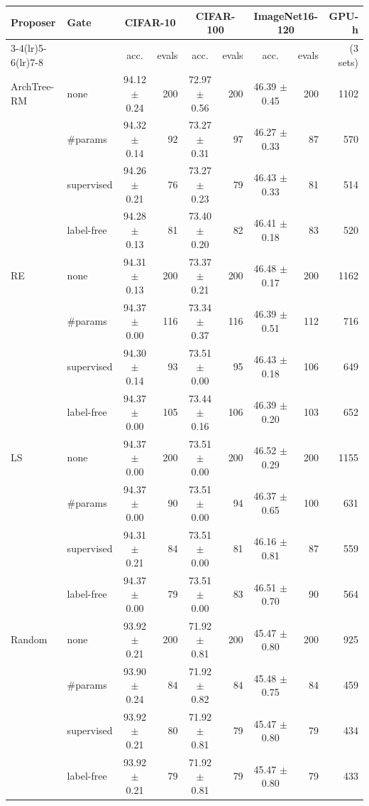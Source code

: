 \begin{tabular}{@{}llcrcrcrr@{}}
\toprule
\multirow{2}{*}{Proposer} & \multirow{2}{*}{Gate} & \multicolumn{2}{c}{CIFAR-10} & \multicolumn{2}{c}{CIFAR-100} & \multicolumn{2}{c}{ImageNet16-120} & GPU-h\\
\cmidrule(lr){3-4}\cmidrule(lr){5-6}\cmidrule(lr){7-8}
 & & acc. & evals & acc. & evals & acc. & evals & (3 sets)\\
\midrule
ArchTree-RM & none & 94.12 $\pm$ 0.24 & 200 & 72.97 $\pm$ 0.56 & 200 & 46.39 $\pm$ 0.45 & 200 & 1102\\
 & \#params & 94.32 $\pm$ 0.14 & 92 & 73.27 $\pm$ 0.31 & 97 & 46.27 $\pm$ 0.33 & 87 & 570\\
 & supervised & 94.26 $\pm$ 0.21 & 76 & 73.27 $\pm$ 0.23 & 79 & 46.43 $\pm$ 0.33 & 81 & 514\\
 & label-free & 94.28 $\pm$ 0.13 & 81 & 73.40 $\pm$ 0.20 & 82 & 46.41 $\pm$ 0.18 & 83 & 520\\
\midrule
RE & none & 94.31 $\pm$ 0.13 & 200 & 73.37 $\pm$ 0.21 & 200 & 46.48 $\pm$ 0.17 & 200 & 1162\\
 & \#params & 94.37 $\pm$ 0.00 & 116 & 73.34 $\pm$ 0.37 & 116 & 46.39 $\pm$ 0.51 & 112 & 716\\
 & supervised & 94.30 $\pm$ 0.14 & 93 & 73.51 $\pm$ 0.00 & 95 & 46.43 $\pm$ 0.18 & 106 & 649\\
 & label-free & 94.37 $\pm$ 0.00 & 105 & 73.44 $\pm$ 0.16 & 106 & 46.39 $\pm$ 0.20 & 103 & 652\\
\midrule
LS & none & 94.37 $\pm$ 0.00 & 200 & 73.51 $\pm$ 0.00 & 200 & 46.52 $\pm$ 0.29 & 200 & 1155\\
 & \#params & 94.37 $\pm$ 0.00 & 90 & 73.51 $\pm$ 0.00 & 94 & 46.37 $\pm$ 0.65 & 100 & 631\\
 & supervised & 94.31 $\pm$ 0.21 & 84 & 73.51 $\pm$ 0.00 & 81 & 46.16 $\pm$ 0.81 & 87 & 559\\
 & label-free & 94.37 $\pm$ 0.00 & 79 & 73.51 $\pm$ 0.00 & 83 & 46.51 $\pm$ 0.70 & 90 & 564\\
\midrule
Random & none & 93.92 $\pm$ 0.21 & 200 & 71.92 $\pm$ 0.81 & 200 & 45.47 $\pm$ 0.80 & 200 & 925\\
 & \#params & 93.90 $\pm$ 0.24 & 84 & 71.92 $\pm$ 0.82 & 84 & 45.48 $\pm$ 0.75 & 84 & 459\\
 & supervised & 93.92 $\pm$ 0.21 & 80 & 71.92 $\pm$ 0.81 & 79 & 45.47 $\pm$ 0.80 & 79 & 434\\
 & label-free & 93.92 $\pm$ 0.21 & 79 & 71.92 $\pm$ 0.81 & 79 & 45.47 $\pm$ 0.80 & 79 & 433\\

\end{tabular}
